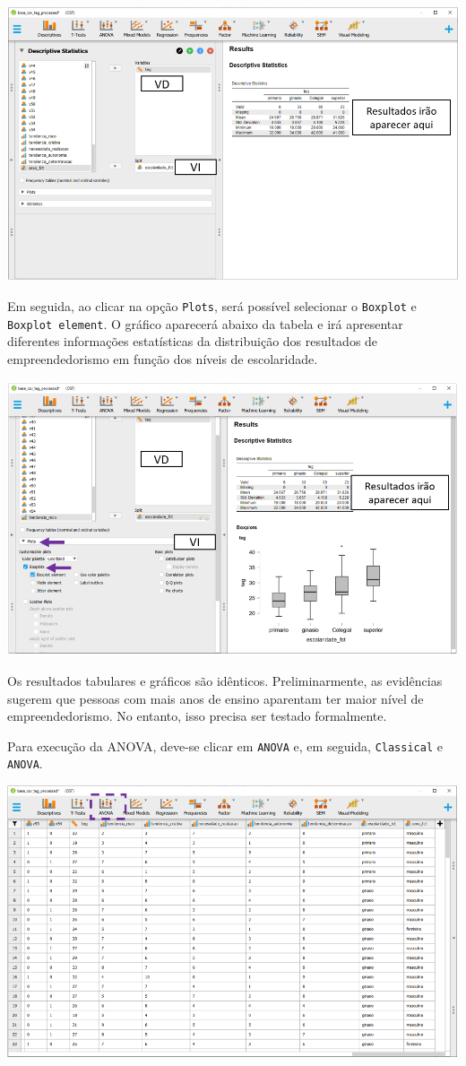 \documentclass[
]{book}
\begin{document}
\includegraphics{./img/cap_anova_descritivo.png}

Em seguida, ao clicar na opção \texttt{Plots}, será possível selecionar o \texttt{Boxplot} e \texttt{Boxplot\ element}. O gráfico aparecerá abaixo da tabela e irá apresentar diferentes informações estatísticas da distribuição dos resultados de empreendedorismo em função dos níveis de escolaridade.

\includegraphics{./img/cap_anova_descritivo2.png}

Os resultados tabulares e gráficos são idênticos. Preliminarmente, as evidências sugerem que pessoas com mais anos de ensino aparentam ter maior nível de empreendedorismo. No entanto, isso precisa ser testado formalmente.

Para execução da ANOVA, deve-se clicar em \texttt{ANOVA} e, em seguida, \texttt{Classical} e \texttt{ANOVA}.

\includegraphics{./img/cap_anova_interface.png}
\end{document}
